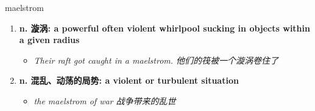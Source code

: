 
\begin{frame}
{\huge maelstrom}
\begin{center}
\begin{enumerate}\Large
  \item \textbf{n. 漩涡: a powerful often violent whirlpool sucking in objects within a given radius}
  \begin{itemize}
    \item \em{\Large{Their raft got caught in a maelstrom. 他们的筏被一个漩涡卷住了}}
  \end{itemize}
  \item \textbf{n. 混乱、动荡的局势: a violent or turbulent situation}
  \begin{itemize}
    \item \em{\Large{the maelstrom of war 战争带来的乱世}}
  \end{itemize}
\end{enumerate}
\end{center}
\end{frame}

